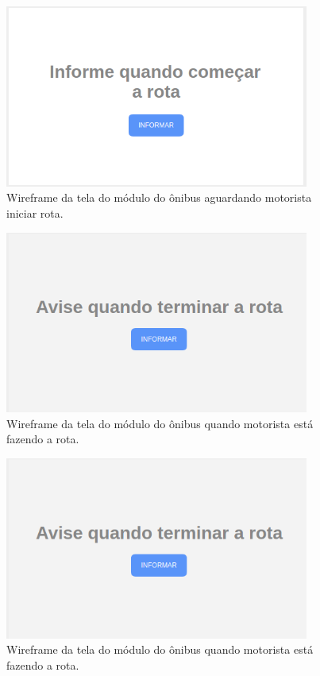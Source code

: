 \documentclass[
	12pt,				%
	oneside,			%
	a4paper,			%
	brazil				%
]{abntex2}
\begin{document}
\begin{apendicesenv}
\begin{figure}[H]
\centering
\includegraphics[width=10cm, center]{images/busmodule-comecar-rota}
\caption{Wireframe da tela do módulo do ônibus aguardando motorista iniciar rota.}
\label{Rotulo}
\end{figure}

\begin{figure}[H]
\centering
\includegraphics[width=10cm, center]{images/busmodule-finish-route}
\caption{Wireframe da tela do módulo do ônibus quando motorista está fazendo a rota.}
\label{Rotulo}
\end{figure}

\begin{figure}[H]
\centering
\includegraphics[width=10cm, center]{images/busmodule-finish-route}
\caption{Wireframe da tela do módulo do ônibus quando motorista está fazendo a rota.}
\label{Rotulo}
\end{figure}


\end{apendicesenv}
\end{document}
